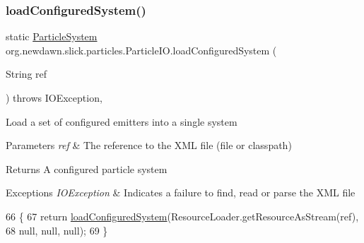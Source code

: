 \subsubsection{\texorpdfstring{load\+Configured\+System()}{loadConfiguredSystem()}\hspace{0.1cm}{\footnotesize\ttfamily [2/9]}}
{\footnotesize\ttfamily static \mbox{\hyperlink{classorg_1_1newdawn_1_1slick_1_1particles_1_1_particle_system}{Particle\+System}} org.\+newdawn.\+slick.\+particles.\+Particle\+I\+O.\+load\+Configured\+System (\begin{DoxyParamCaption}\item[{String}]{ref }\end{DoxyParamCaption}) throws I\+O\+Exception\hspace{0.3cm}{\ttfamily [inline]}, {\ttfamily [static]}}

Load a set of configured emitters into a single system


\begin{DoxyParams}{Parameters}
{\em ref} & The reference to the X\+ML file (file or classpath) \\
\hline
\end{DoxyParams}
\begin{DoxyReturn}{Returns}
A configured particle system 
\end{DoxyReturn}

\begin{DoxyExceptions}{Exceptions}
{\em I\+O\+Exception} & Indicates a failure to find, read or parse the X\+ML file \\
\hline
\end{DoxyExceptions}

\begin{DoxyCode}
66                                \{
67         \textcolor{keywordflow}{return} \mbox{\hyperlink{classorg_1_1newdawn_1_1slick_1_1particles_1_1_particle_i_o_a1da2bcc8784c9cf967326954bc3c9d33}{loadConfiguredSystem}}(ResourceLoader.getResourceAsStream(ref),
68             null, null, null);
69     \}
\end{DoxyCode}
\mbox{\label{classorg_1_1newdawn_1_1slick_1_1particles_1_1_particle_i_o_a02e8f7b4fbdd36e7cfbca64839bb3470}} 
